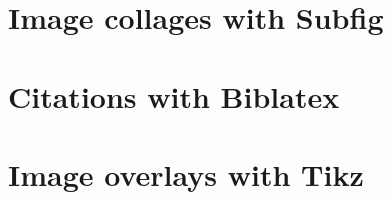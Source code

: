 \section{Image collages with Subfig}

\section{Citations with Biblatex}

\section{Image overlays with Tikz}
